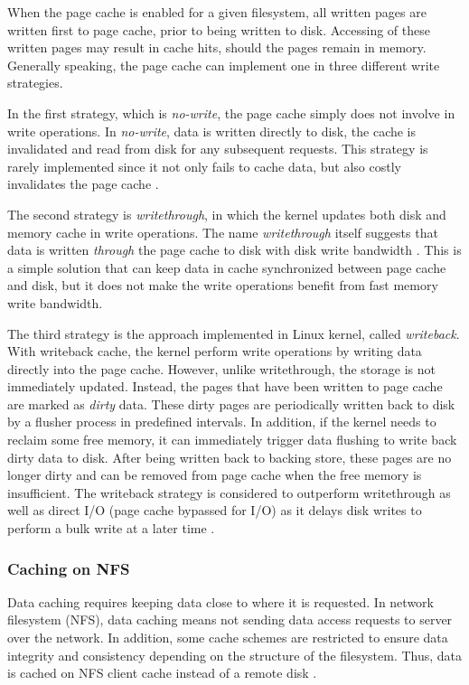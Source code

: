 When the page cache is enabled for a given filesystem, all written pages 
are written first to page cache, prior to being written to disk.
Accessing of these written pages may result in cache hits, should the pages 
remain in memory.
Generally speaking, the page cache can implement one in three 
different write strategies.

In the first strategy, which is \textit{no-write}, the page cache simply 
does not involve in write operations. In \textit{no-write}, data is written 
directly to disk, the cache is invalidated and read from disk for any 
subsequent requests. 
This strategy is rarely implemented since it not only fails to cache data, 
but also costly invalidates the page cache \cite{linuxdev3rd2010}.

The second strategy is \textit{writethrough}, in which the kernel updates both 
disk and memory cache in write operations. The name \textit{writethrough} 
itself suggests that data is written \textit{through} the page cache to disk 
with disk write bandwidth \cite{linuxdev3rd2010}.
This is a simple solution that can keep data in cache synchronized 
between page cache and disk, but it does not make the write operations 
benefit from fast memory write bandwidth. 

The third strategy is the approach implemented in Linux kernel, 
called \textit{writeback}. 
With writeback cache, the kernel perform write operations by writing data 
directly into the page cache. However, unlike writethrough, the storage is not 
immediately updated. Instead, the pages that have been written to page cache 
are marked as \textit{dirty} data. These dirty pages are periodically written 
back to disk by a flusher process in predefined intervals. 
In addition, if the kernel needs to reclaim some free memory, it can 
immediately trigger data flushing to write back dirty data to disk. 
After being written back to backing store, these pages are no longer dirty 
and can be removed from page cache when the free memory is insufficient.
The writeback strategy is considered to outperform writethrough as well as
direct I/O (page cache bypassed for I/O) as it delays disk writes to perform 
a bulk write at a later time \cite{linuxdev3rd2010}.

\subsubsection{Caching on NFS}

Data caching requires keeping data close to where it is requested. 
In network filesystem (NFS), data caching means not sending data access 
requests to server over the network. 
In addition, some cache schemes are restricted to ensure data integrity and 
consistency depending on the structure of the filesystem.
Thus, data is cached on NFS client cache instead of a remote disk 
\cite{eisler2001managing}. 

